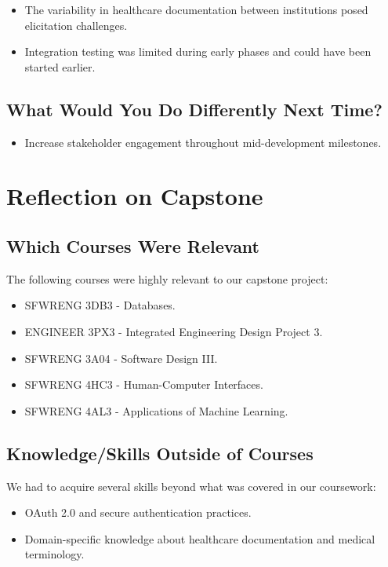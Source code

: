 \documentclass{article}
\begin{document}
 \begin{itemize}
     \item The variability in healthcare documentation between institutions posed elicitation challenges.
     \item Integration testing was limited during early phases and could have been started earlier.
 \end{itemize}
 
 \subsection{What Would You Do Differently Next Time?}
 
 \begin{itemize}
     \item Increase stakeholder engagement throughout mid-development milestones.
 \end{itemize}
 
 \section{Reflection on Capstone}
 
 \subsection{Which Courses Were Relevant}
 
 The following courses were highly relevant to our capstone project:
 \begin{itemize}
     \item SFWRENG 3DB3 - Databases.
     \item ENGINEER 3PX3 - Integrated Engineering Design Project 3.
     \item SFWRENG 3A04 - Software Design III.
     \item SFWRENG 4HC3 - Human-Computer Interfaces.
     \item SFWRENG 4AL3 - Applications of Machine Learning.
 \end{itemize}
 
 \subsection{Knowledge/Skills Outside of Courses}
 
 We had to acquire several skills beyond what was covered in our coursework:
 \begin{itemize}
     \item OAuth 2.0 and secure authentication practices.
     \item Domain-specific knowledge about healthcare documentation and medical terminology.
 \end{itemize}
\end{document}
